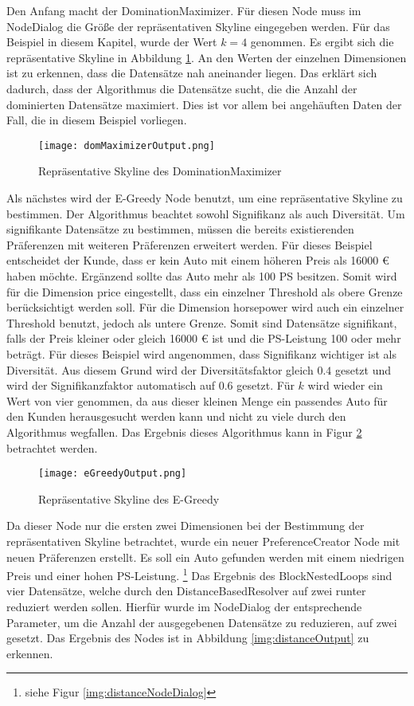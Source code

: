 Den Anfang macht der DominationMaximizer. Für diesen Node muss im NodeDialog die Größe der repräsentativen Skyline eingegeben werden. Für das Beispiel in diesem Kapitel, wurde der Wert $k=4$ genommen. Es ergibt sich die repräsentative Skyline in Abbildung \ref{img:domMaximizerOutput}. An den Werten der einzelnen Dimensionen ist zu erkennen, dass die Datensätze nah aneinander liegen. Das erklärt sich dadurch, dass der Algorithmus die Datensätze sucht, die die Anzahl der dominierten Datensätze maximiert. Dies ist vor allem bei angehäuften Daten der Fall, die in diesem Beispiel vorliegen.

\begin{figure}[H]
	\centering
	\texttt{[image: domMaximizerOutput.png]}
	\caption{Repräsentative Skyline des DominationMaximizer}
	\label{img:domMaximizerOutput}
\end{figure} 

Als nächstes wird der E-Greedy Node benutzt, um eine repräsentative Skyline zu bestimmen. Der Algorithmus beachtet sowohl Signifikanz als auch Diversität. Um signifikante Datensätze zu bestimmen, müssen die bereits existierenden Präferenzen mit weiteren Präferenzen erweitert werden. Für dieses Beispiel entscheidet der Kunde, dass er kein Auto mit einem höheren Preis als 16000 \euro{} haben möchte. Ergänzend sollte das Auto mehr als 100 PS besitzen. Somit wird für die Dimension price eingestellt, dass ein einzelner Threshold als obere Grenze berücksichtigt werden soll. Für die Dimension horsepower wird auch ein einzelner Threshold benutzt, jedoch als untere Grenze. Somit sind Datensätze signifikant, falls der Preis kleiner oder gleich 16000 \euro{} ist und die PS-Leistung 100 oder mehr beträgt.
Für dieses Beispiel wird angenommen, dass Signifikanz wichtiger ist als Diversität. Aus diesem Grund wird der Diversitätsfaktor gleich $0.4$ gesetzt und wird der Signifikanzfaktor automatisch auf 0.6 gesetzt. Für $k$ wird wieder ein Wert von vier genommen, da aus dieser kleinen Menge ein passendes Auto für den Kunden herausgesucht werden kann und nicht zu viele durch den Algorithmus wegfallen. Das Ergebnis dieses Algorithmus kann in Figur \ref{img:eGreedyOutput} betrachtet werden.

\begin{figure}[H]
	\centering
	\texttt{[image: eGreedyOutput.png]}
	\caption{Repräsentative Skyline des E-Greedy}
	\label{img:eGreedyOutput}
\end{figure} 

Da dieser Node nur die ersten zwei Dimensionen bei der Bestimmung der repräsentativen Skyline betrachtet, wurde ein neuer PreferenceCreator Node mit neuen Präferenzen erstellt. Es soll ein Auto gefunden werden mit einem niedrigen Preis und einer hohen PS-Leistung. \footnote{siehe Figur \ref{img:distanceNodeDialog}} Das Ergebnis des BlockNestedLoops sind vier Datensätze, welche durch den DistanceBasedResolver auf zwei runter reduziert werden sollen. Hierfür wurde im NodeDialog der entsprechende Parameter, um die Anzahl der ausgegebenen Datensätze zu reduzieren, auf zwei gesetzt. Das Ergebnis des Nodes ist in Abbildung \ref{img:distanceOutput} zu erkennen.

